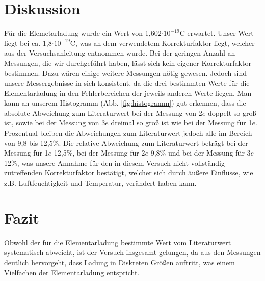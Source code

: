 \documentclass[12pt]{scrartcl}
\begin{document}
\section{Diskussion}
Für die Elemetarladung wurde ein Wert von 1,602$\cdot 10^{-19}$C erwartet. Unser Wert liegt bei ca. 1,8$\cdot 10^{-19}$C, was an dem verwendetem Korrekturfaktor liegt, welcher aus der Versuchsanleitung entnommen wurde. Bei der geringen Anzahl an Messungen, die wir durchgeführt haben, lässt sich kein eigener Korrekturfaktor bestimmen. Dazu wären einige weitere Messungen nötig gewesen. Jedoch sind unsere Messergebnisse in sich konsistent, da die drei bestimmten Werte für die Elementarladung in den Fehlerbereichen der jeweils anderen Werte liegen. Man kann an unserem Histogramm (Abb. \ref{fig:histogramm}) gut erkennen, dass die absolute Abweichung zum Literaturwert bei der Messung von 2$e$ doppelt so groß ist, sowie bei der Messung von 3$e$ dreimal so groß ist wie bei der Messung für 1$e$. Prozentual bleiben die Abweichungen zum Literaturwert jedoch alle im Bereich von 9,8 bis 12,5\%. Die relative Abweichung zum Literaturwert beträgt bei der Messung für 1$e$ 12,5\%, bei der Messung für 2$e$ 9,8\% und bei der Messung für 3$e$ 12\%, was unsere Annahme für den in diesem Versuch nicht vollständig zutreffenden Korrekturfaktor bestätigt, welcher sich durch äußere Einflüsse, wie z.B. Luftfeuchtigkeit und Temperatur, verändert haben kann.   

\section{Fazit}
Obwohl der für die Elementarladung bestimmte Wert vom Literaturwert systematisch abweicht, ist der Versuch insgesamt gelungen, da aus den Messungen deutlich hervorgeht, dass Ladung in Diskreten Größen auftritt, was einem Vielfachen der Elementarladung entspricht.
\end{document}
